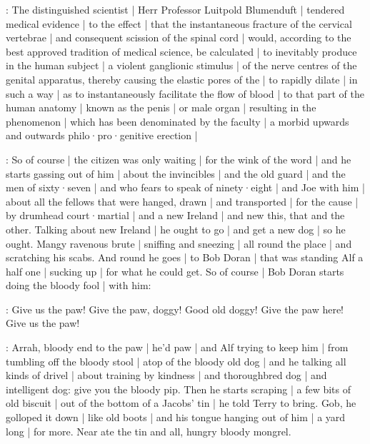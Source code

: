 :
The distinguished scientist |
Herr Professor Luitpold Blumenduft |
tendered medical evidence |
to the effect |
that the instantaneous fracture of the cervical vertebrae
 |
and consequent scission of the spinal cord |
would,
according to the best approved tradition of medical science,
be calculated |
to inevitably produce in the human subject |
a violent ganglionic stimulus |
of the nerve centres of the genital apparatus,
thereby causing the elastic pores of the  |
to rapidly dilate |
in such a way |
as to instantaneously facilitate the flow of blood |
to that part of the human anatomy |
known as the penis |
or male organ |
resulting in the phenomenon |
which has been denominated by the faculty |
a morbid upwards and outwards philo·pro·genitive erection |

\Nq:
So of course |
the citizen was only waiting |
for the wink of the word |
and he starts gassing out of him
 |
about the invincibles |
and the old guard |
and the men of sixty·seven |
and who fears to speak of ninety·eight |
and Joe with him |
about all the fellows that were hanged,
drawn |
and transported |
for the cause |
by drumhead court·martial |
and a new Ireland |
and new this, that and the other.
Talking about new Ireland |
he ought to go |
and get a new dog |
so he ought.
Mangy ravenous brute |
sniffing and sneezing |
all round the place |
and scratching his scabs.
And round he goes |
to Bob Doran |
that was standing Alf a half one |
sucking up |
for what he could get.
So of course |
Bob Doran starts doing the bloody fool |
with him:

\doran:
Give us the paw!
Give the paw,
doggy!
Good old doggy!
Give the paw here!
Give us the paw!

\Nq:
Arrah,
bloody end to the paw |
he'd paw |
and Alf trying to keep him |
from tumbling off the bloody stool |
atop of the bloody old dog |
and he talking all kinds of drivel |
about training by kindness |
and thoroughbred dog |
and intelligent dog:
give you the bloody pip.
Then he starts scraping |
a few bits of old biscuit |
out of the bottom of a Jacobs' tin |
he told Terry to bring.
Gob,
he golloped it down |
like old boots |
and his tongue hanging out of him |
a yard long |
for more.
Near ate the tin and all,
hungry bloody mongrel.


